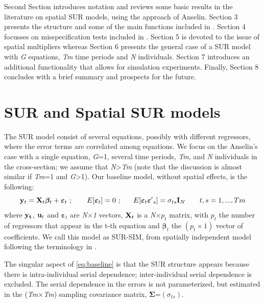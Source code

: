 \documentclass[article]{jss}
\begin{document}
Second Section introduces notation and reviews some basic results in the literature on spatial SUR models, using the approach of Anselin. Section 3 presents the structure and some of the main functions included in . Section 4 focusses on misspecification tests included in . Section 5 is devoted to the issue of spatial multipliers whereas Section 6 presents the general case of a SUR model with \emph{G} equations, \emph{Tm} time periods and \emph{N} individuals. Section 7 introduces an additional functionality that allows for simulation experiments. Finally, Section 8 concludes with a brief summary and prospects for the future.

\hypertarget{SecSUR}{%
\section{SUR and Spatial SUR models}\label{SecSUR}}

The SUR model consist of several equations, possibly with different regressors, where the error terms are correlated among equations. We focus on the Anselin's case with a single equation, \emph{G}=1, several time periods, \emph{Tm}, and \emph{N} individuals in the cross-section; we assume that \emph{N}\textgreater{}\emph{Tm} (note that the discussion is almost similar if \emph{Tm}=1 and \emph{G}\textgreater{}1). Our baseline model, without spatial effects, is the following:
\begin{equation}
{{\bf y}_t}={{\bf X}_t} {\boldsymbol{\beta} }_t+{\boldsymbol{\varepsilon}}_t\ ; \ \ \ \ \ \
E[{\boldsymbol \varepsilon}_t]=0\ ;\ \ \ \ \ E[{\boldsymbol \varepsilon}_t {\boldsymbol \varepsilon'}_s]= \sigma_{ts} {\bf I}_N  \ \ \ \ \ \ t,s=1,...,Tm
 \label{eq:baseline}
\end{equation}
where \({\bf y_t}\), \({\bf u}_t\) and \({\boldsymbol \varepsilon}_t\) are \emph{N}\(\times\)\emph{1} vectors, \({\bf X}_t\) is a \emph{N}\(\times p_t\) matrix, with \(p_t\) the number of regressors that appear in the t-th equation and \(\boldsymbol{\beta}_t\) the \((p_t \times 1)\) vector of coefficients. We call this model as SUR-SIM, from spatially independent model following the terminology in \citet{Lopez2014}.

The singular aspect of \eqref{eq:baseline} is that the SUR structure appears because there is intra-individual serial dependence; inter-individual serial dependence is excluded. The serial dependence in the errors is not parameterized, but estimated in the (\emph{Tm}\(\times\)\emph{Tm}) sampling covariance matrix, \(\boldsymbol \Sigma\)=\((\sigma_{ts})\).
\end{document}
